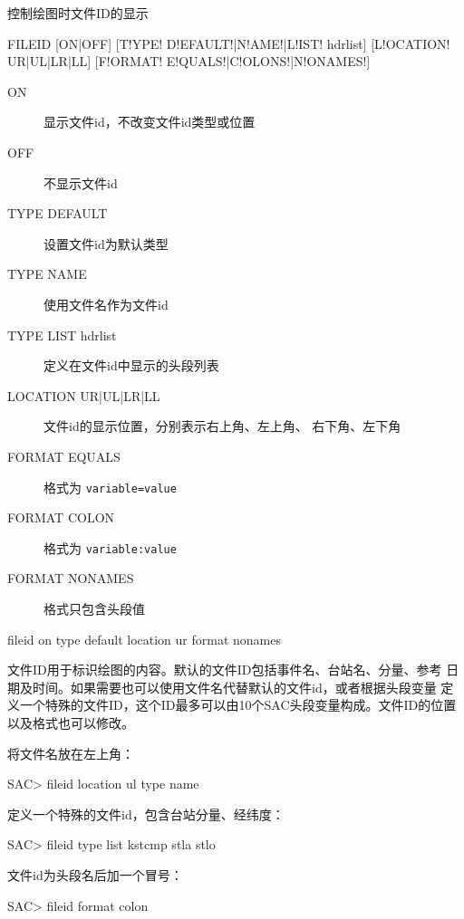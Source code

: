\label{cmd:fileid}

控制绘图时文件ID的显示

\begin{SACSTX}
FILEID [ON|OFF] [T!YPE! D!EFAULT!|N!AME!|L!IST! hdrlist] [L!OCATION! UR|UL|LR|LL]
    [F!ORMAT! E!QUALS!|C!OLONS!|N!ONAMES!]
\end{SACSTX}

\begin{description}
\item [ON] 显示文件id，不改变文件id类型或位置
\item [OFF] 不显示文件id
\item [TYPE DEFAULT] 设置文件id为默认类型
\item [TYPE NAME] 使用文件名作为文件id
\item [TYPE LIST hdrlist] 定义在文件id中显示的头段列表
\item [LOCATION UR|UL|LR|LL] 文件id的显示位置，分别表示右上角、左上角、
    右下角、左下角
\item [FORMAT EQUALS] 格式为 \texttt{variable=value}
\item [FORMAT COLON] 格式为 \texttt{variable:value}
\item [FORMAT NONAMES] 格式只包含头段值
\end{description}

\begin{SACDFT}
fileid on type default location ur format nonames
\end{SACDFT}

文件ID用于标识绘图的内容。默认的文件ID包括事件名、台站名、分量、参考
日期及时间。如果需要也可以使用文件名代替默认的文件id，或者根据头段变量
定义一个特殊的文件ID，这个ID最多可以由10个SAC头段变量构成。文件ID的位置
以及格式也可以修改。

将文件名放在左上角：
\begin{SACCode}
SAC> fileid location ul type name
\end{SACCode}

定义一个特殊的文件id，包含台站分量、经纬度：
\begin{SACCode}
SAC> fileid type list kstcmp stla stlo
\end{SACCode}

文件id为头段名后加一个冒号：
\begin{SACCode}
SAC> fileid format colon
\end{SACCode}
